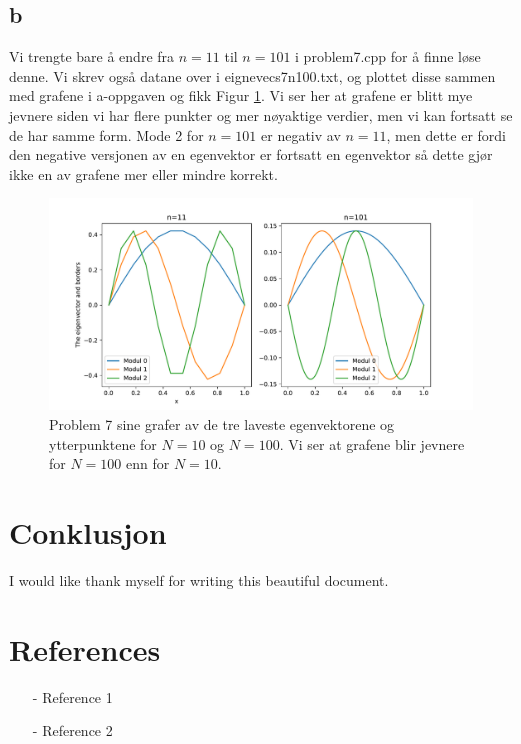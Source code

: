 \documentclass[reprint,english,notitlepage]{revtex4-1}  %
\begin{document}
\subsection*{b}
Vi trengte bare å endre fra $n=11$ til $n=101$ i problem7.cpp for å finne løse denne. Vi skrev også datane over i eignevecs7n100.txt, og plottet disse sammen med grafene i a-oppgaven og fikk Figur \ref{p7graf}. Vi ser her at grafene er blitt mye jevnere siden vi har flere punkter og mer nøyaktige verdier, men vi kan fortsatt se de har samme form. Mode 2 for $n=101$ er negativ av $n=11$, men dette er fordi den negative versjonen av en egenvektor er fortsatt en egenvektor så dette gjør ikke en av grafene mer eller mindre korrekt.
\begin{figure}
	\label{p7graf}
	\centering 
	\includegraphics[scale=0.5]{Images/p7.pdf}
	\caption{Problem 7 sine grafer av de tre laveste egenvektorene og ytterpunktene for $N=10$ og $N=100$. Vi ser at grafene blir jevnere for $N=100$ enn for $N=10$.}
\end{figure}
\section{Conklusjon}
\begin{acknowledgments}  %
I would like thank myself for writing this beautiful document.
\end{acknowledgments}


\section*{References}  %
\begin{itemize}
\item[-]Reference 1
\item[-]Reference 2
\end{itemize}
\end{document}
